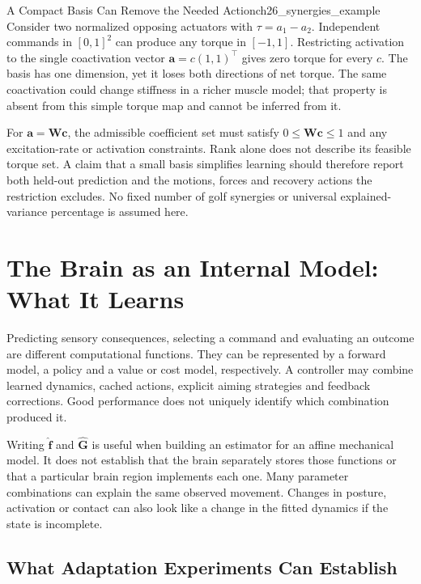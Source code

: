 \begin{example}{A Compact Basis Can Remove the Needed Action}{ch26_synergies_example}
Consider two normalized opposing actuators with $\tau=a_1-a_2$. Independent commands in $[0,1]^2$ can produce any torque in $[-1,1]$. Restricting activation to the single coactivation vector $\bm a=c(1,1)^\top$ gives zero torque for every $c$. The basis has one dimension, yet it loses both directions of net torque. The same coactivation could change stiffness in a richer muscle model; that property is absent from this simple torque map and cannot be inferred from it.
\end{example}

For $\bm a=\bm W\bm c$, the admissible coefficient set must satisfy $0\leq\bm W\bm c\leq1$ and any excitation-rate or activation constraints. Rank alone does not describe its feasible torque set. A claim that a small basis simplifies learning should therefore report both held-out prediction and the motions, forces and recovery actions the restriction excludes. No fixed number of golf synergies or universal explained-variance percentage is assumed here.

\section{The Brain as an Internal Model: What It Learns}
\label{sec:ch26_internal_model_what}

Predicting sensory consequences, selecting a command and evaluating an outcome are different computational functions. They can be represented by a forward model, a policy and a value or cost model, respectively. A controller may combine learned dynamics, cached actions, explicit aiming strategies and feedback corrections. Good performance does not uniquely identify which combination produced it.

Writing $\hat{\bm f}$ and $\hat{\bm G}$ is useful when building an estimator for an affine mechanical model. It does not establish that the brain separately stores those functions or that a particular brain region implements each one. Many parameter combinations can explain the same observed movement. Changes in posture, activation or contact can also look like a change in the fitted dynamics if the state is incomplete.

\subsection{What Adaptation Experiments Can Establish}
\label{subsec:ch26_brain_learns_physics}

